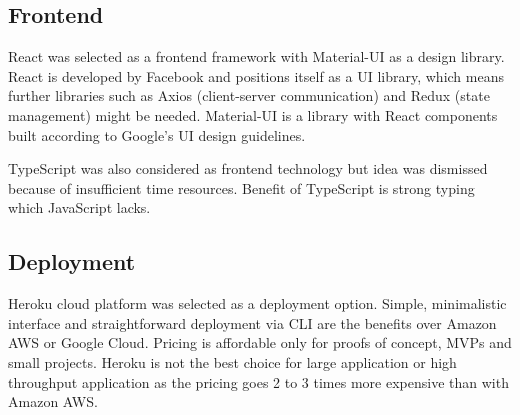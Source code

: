\subsection{Frontend}\label{subsec:ts-frontend}

React was selected as a frontend framework with Material-UI as a design library.\cite{react, material}
React is developed by Facebook and positions itself as a UI library, which means further libraries such as Axios (client-server communication) and Redux (state management) might be needed.\cite{axios, redux}
Material-UI is a library with React components built according to Google's UI design guidelines.

TypeScript was also considered as frontend technology but idea was dismissed because of insufficient time resources.
Benefit of TypeScript is strong typing which JavaScript lacks.\cite{typescript}

\subsection{Deployment}\label{subsec:ts-deployment}

Heroku cloud platform was selected as a deployment option.
Simple, minimalistic interface and straightforward deployment via CLI are the benefits over Amazon AWS or Google Cloud.
Pricing is affordable only for proofs of concept, MVPs and small projects.
Heroku is not the best choice for large application or high throughput application as the pricing goes 2 to 3 times more expensive than with Amazon AWS\@.
